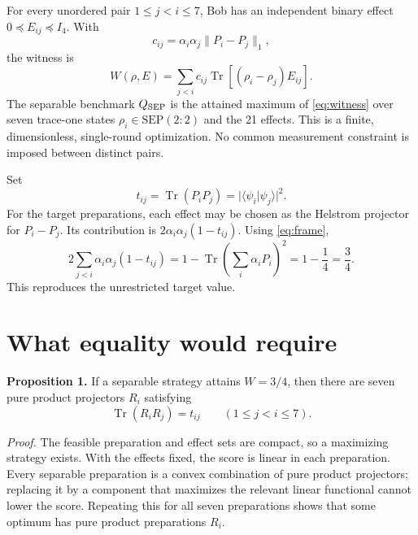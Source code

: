 \documentclass[11pt]{article}
\newcommand{\SEP}{\mathrm{SEP}}
\newcommand{\Tr}{\operatorname{Tr}}
\begin{document}
For every unordered pair $1\leq j<i\leq7$, Bob has an independent binary
effect $0\preceq E_{ij}\preceq I_4$.  With
\begin{equation}
 c_{ij}=\alpha_i\alpha_j\lVert P_i-P_j\rVert_1,
\end{equation}
the witness is
\begin{equation}
 W(\rho,E)=\sum_{j<i}c_{ij}
       \Tr[(\rho_i-\rho_j)E_{ij}].                       \label{eq:witness}
\end{equation}
The separable benchmark $Q_{\rm SEP}$ is the attained maximum of
\eqref{eq:witness} over seven trace-one states
$\rho_i\in\SEP(2{:}2)$ and the 21 effects.  This is a finite,
dimensionless, single-round optimization.  No common measurement constraint is
imposed between distinct pairs.

Set
\begin{equation}
 t_{ij}=\Tr(P_iP_j)=\lvert\langle\psi_i|\psi_j\rangle\rvert^2.
\end{equation}
For the target preparations, each effect may be chosen as the Helstrom
projector for $P_i-P_j$.  Its contribution is
$2\alpha_i\alpha_j(1-t_{ij})$.  Using \eqref{eq:frame},
\begin{equation}
 2\sum_{j<i}\alpha_i\alpha_j(1-t_{ij})
 =1-\Tr\!\left(\sum_i\alpha_iP_i\right)^2
 =1-\frac14=\frac34.                                    \label{eq:baseline}
\end{equation}
This reproduces the unrestricted target value.

\section{What equality would require}
\label{sec:equality}

\textbf{Proposition 1.}
If a separable strategy attains $W=3/4$, then there are seven pure product
projectors $R_i$ satisfying
\begin{equation}
  \Tr(R_iR_j)=t_{ij}\qquad(1\leq j<i\leq7).              \label{eq:matching}
\end{equation}

\emph{Proof.}
The feasible preparation and effect sets are compact, so a maximizing strategy
exists.  With the effects fixed, the score is linear in each preparation.
Every separable preparation is a convex combination of pure product
projectors; replacing it by a component that maximizes the relevant linear
functional cannot lower the score.  Repeating this for all seven preparations
shows that some optimum has pure product preparations $R_i$.
\end{document}
